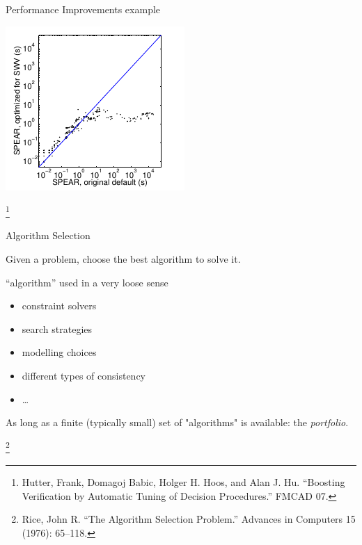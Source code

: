 \documentclass{cons-beamer}
\newcommand\blfootnote[1]{%
  \begingroup
  \renewcommand\thefootnote{}\footnote{
  \footnotesize #1
  \vspace*{1em}}%
  \addtocounter{footnote}{-1}%
  \endgroup
}
\begin{document}
\begin{frame}{Performance Improvements example}
  \begin{center}
    \includegraphics[height=.68\textheight]{images/speedup}
  \end{center}
  \blfootnote{%
  Hutter, Frank, Domagoj Babic, Holger H. Hoos, and Alan J. Hu. ``Boosting
  Verification by Automatic Tuning of Decision Procedures.'' FMCAD 07.
  }
\end{frame}

\begin{frame}{Algorithm Selection}
  \begin{center}
    Given a problem, choose the best algorithm to solve it.
  \end{center}
  

	``algorithm'' used in a very loose sense
	\begin{itemize}
		\item constraint solvers
		\item search strategies
		\item modelling choices
		\item different types of consistency
		\item \ldots
	\end{itemize}

  As long as a finite (typically small) set of "algorithms" is available: the \textit{portfolio}.

  \blfootnote{Rice, John R. ``The Algorithm Selection Problem.'' Advances in Computers 15 (1976): 65–118.}
\end{frame}
\end{document}
